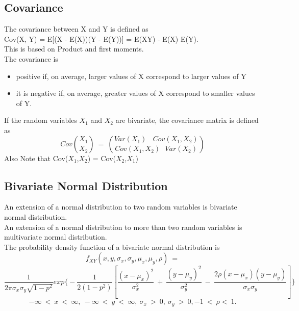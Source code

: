 \subsection*{Covariance}
The covariance between X and Y is defined as\\
Cov(X, Y) = E[(X - E(X))(Y - E(Y))] = E(XY) - E(X) E(Y).\\
This is based on Product and first moments.\\
The covariance is
\begin{itemize}
    \item positive if, on average, larger values of X correspond to larger
values of Y
    \item it is negative if, on average, greater values of X correspond to
smaller values of Y.
\end{itemize}
If the random variables $X_1$ and $X_2$ are bivariate, the covariance
matrix is defined as
\[
Cov\binom{X_1}{X_2}\ =\ \binom{Var(X_1)\ \ \ \ Cov(X_1,X_2)}{Cov(X_1,X_2)\ \ \ Var(X_2)}
\]
Also Note that Cov($X_1$,$X_2$) = Cov($X_2$,$X_1$)

\subsection*{Bivariate Normal Distribution}
An extension of a normal distribution to two random variables is
bivariate normal distribution.\\
An extension of a normal distribution to more than two random
variables is multivariate normal distribution.\\
The probability density function of a bivariate normal distribution is
\[
f_{XY}(x,y,\sigma_x,\sigma_y,\mu_x,\mu_y,\rho)\ =\]
\[
\frac{1}{2\pi\sigma_x\sigma_y\sqrt{1-p^2}}exp\Bigg\{-\frac{1}{2(1-p^2)}\left[\frac{(x-\mu_x)^2}{\sigma_x^2}\ +\ \frac{(y-\mu_y)^2}{\sigma_y^2}\ -\ \frac{2\rho(x-\mu_x)(y-\mu_y)}{\sigma_x\sigma_y}\right]\Bigg\}
\]
\[
-\infty\ <\ x\ <\ \infty,\ -\infty\ <\ y\ <\ \infty,\ \sigma_x\ >\ 0,\ \sigma_y\ >\ 0, -1\ <\ \rho <\ 1.
\]

